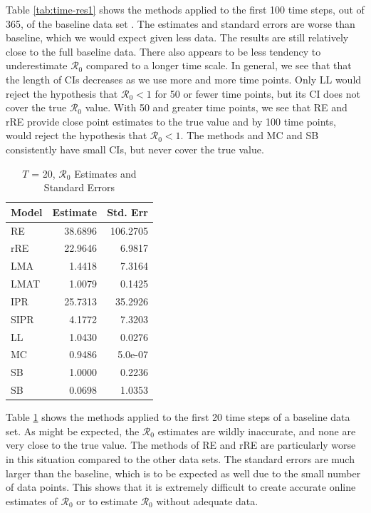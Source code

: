\documentclass[12pt]{article}
\newcommand{\rr}{\ensuremath{\mathcal{R}_0}}
\begin{document}
Table \ref{tab:time-res1} shows the methods applied to the first 100 time steps, out of 365, of the baseline data set . The estimates and standard errors are worse than baseline, which we would expect given less data. The results are still relatively close to the full baseline data. There also appears to be less tendency to underestimate $\rr$ compared to a longer time scale.  In general, we see that that the length of CIs decreases as we use more and more time points.  Only LL would reject the hypothesis that $\rr < 1$ for 50 or fewer time points, but its CI does not cover the true $\rr$ value.  With 50 and greater time points, we see that RE and rRE provide close point estimates to the true value and by 100 time points, would reject the hypothesis that $\rr < 1$.  The methods and MC and SB consistently have small CIs, but never cover the true value.

\begin{table}[H]
  \centering
	\begin{tabular}[t]{l|r|r}
		\hline
		Model & Estimate & Std. Err\\
		\hline
		RE & 38.6896 & 106.2705\\
		\hline
		rRE & 22.9646 & 6.9817\\
		\hline
		LMA & 1.4418 & 7.3164\\
		\hline
		LMAT & 1.0079 & 0.1425\\
		\hline
		IPR & 25.7313 & 35.2926\\
		\hline
		SIPR & 4.1772 & 7.3203\\
		\hline
		LL & 1.0430 & 0.0276\\
		\hline
		MC & 0.9486 & 5.0e-07\\
		\hline
		SB & 1.0000 & 0.2236\\
		\hline
		SB & 0.0698 & 1.0353\\
		\hline
	\end{tabular}
        \caption{$T$ = 20, $\rr$ Estimates and Standard Errors}\label{tab:time-res2}
\end{table}

Table \ref{tab:time-res2} shows the methods applied to the first 20 time steps of a baseline data set. As might be expected, the $\rr$ estimates are wildly inaccurate, and none are very close to the true value. The methods of RE and rRE are particularly worse in this situation compared to the other data sets. The standard errors are much larger than the baseline, which is to be expected as well due to the small number of data points. This shows that it is extremely difficult to create accurate online estimates of $\rr$ or to estimate $\rr$ without adequate data. 
\end{document}
